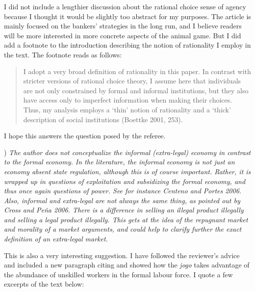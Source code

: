 \documentclass[a4paper,12pt]{article}
\begin{document}
I did not include a lengthier discussion about the rational choice sense of agency because I thought it would be slightly too abstract for my purposes. The article is mainly focused on the bankers' strategies in the long run, and I believe readers will be more interested in more concrete aspects of the animal game. But I did add a footnote to the introduction describing the notion of rationality I employ in the text. The footnote reads as follows: 

\begin{quote}
	I adopt a very broad definition of rationality in this paper. In contrast with stricter versions of rational choice theory, I assume here that individuals are not only constrained by formal and informal institutions, but they also have access only to imperfect information when making their choices. Thus, my analysis employs a ‘thin’ notion of rationality and a ‘thick’ description of social institutions (Boettke 2001, 253).
\end{quote}

I hope this answers the question posed by the referee. 

\vspace{.5cm}

) \textit{The author does not conceptualize the informal (extra-legal) economy in contrast to the formal economy. In the literature, the informal economy is not just an economy absent state regulation, although this is of course important. Rather, it is wrapped up in questions of exploitation and subsidizing the formal economy, and thus once again questions of power. See for instance Centeno and Portes 2006. Also, informal and extra-legal are not always the same thing, as pointed out by Cross and Peña 2006. There is a difference in selling an illegal product illegally and selling a legal product illegally. This gets at the idea of the repugnant market and morality of a market arguments, and could help to clarify further the exact definition of an extra-legal market.}

\vspace{.25cm}

This is also a very interesting suggestion. I have followed the reviewer's advice and included a new paragraph citing \citet{cross2006risk} and showed how the \textit{jogo} takes advantage of the abundance of unskilled workers in the formal labour force. I quote a few excerpts of the text below: 
\end{document}
